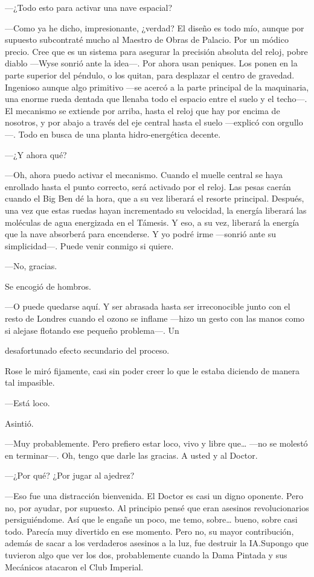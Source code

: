 {---¿Todo esto para activar una nave espacial?}

{---Como ya he dicho, impresionante, ¿verdad? El diseño es todo mío,
	aunque por supuesto subcontraté mucho al Maestro de Obras de Palacio.
	Por un módico precio. Cree que es un sistema para asegurar la precisión
	absoluta del reloj, pobre diablo ---Wyse sonrió ante la idea---. Por
	ahora usan peniques. Los ponen en la parte superior del péndulo, o los
	quitan, para desplazar el centro de gravedad. Ingenioso aunque algo
	primitivo ---se acercó a la parte principal de la maquinaria, una enorme
	rueda dentada que llenaba todo el espacio entre el suelo y el techo---.
	El mecanismo se extiende por arriba, hasta el reloj que hay por encima
	de nosotros, y por abajo a través del eje central hasta el suelo
	---explicó con orgullo---. Todo en busca de una planta hidro-energética
decente.}

{---¿Y ahora qué?}

{---Oh, ahora puedo activar el mecanismo. Cuando el muelle central se
	haya enrollado hasta el punto correcto, será activado por el reloj. Las
	pesas caerán cuando el Big Ben dé la hora, que a su vez liberará el
	resorte principal. Después, una vez que estas ruedas hayan incrementado
	su velocidad, la energía liberará las moléculas de agua energizada en el
	Támesis. Y eso, a su vez, liberará la energía que la nave absorberá para
	encenderse. Y yo podré irme ---sonrió ante su simplicidad---. Puede
venir conmigo si quiere.}

{---No, gracias.}

{Se encogió de hombros.}

{---O puede quedarse aquí. Y ser abrasada hasta ser irreconocible junto
	con el resto de Londres cuando el ozono se inflame ---hizo un gesto con
las manos como si alejase flotando ese pequeño problema---. Un}

{desafortunado efecto secundario del proceso.}

{Rose le miró fijamente, casi sin poder creer lo que le estaba diciendo
de manera tal impasible.}

{---Está loco.}

{Asintió.}

{---Muy probablemente. Pero prefiero estar loco, vivo y libre
	que\ldots{} ---no se molestó en terminar---. Oh, tengo que darle las
gracias. A usted y al Doctor.}

{---¿Por qué? ¿Por jugar al ajedrez?}

{---Eso fue una distracción bienvenida. El Doctor es casi un digno
	oponente. Pero no, por ayudar, por supuesto. Al principio pensé que eran
	asesinos revolucionarios persiguiéndome. Así que le engañe un poco, me
	temo, sobre\ldots{} bueno, sobre casi todo. Parecía muy divertido en ese
	momento. Pero no, su mayor contribución, además de sacar a los
	verdaderos asesinos a la luz, fue destruir la IA.\@ Supongo que tuvieron
	algo que ver los dos, probablemente cuando la Dama Pintada y sus
Mecánicos atacaron el Club Imperial.}

